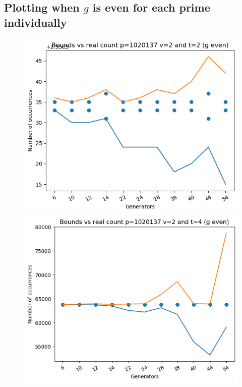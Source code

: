 \documentclass{article}
\begin{document}
\subsection{Plotting when $g$ is even for each prime individually}
\begin{figure}[H]
    \begin{minipage}{.49\textwidth}
            \centering
            \includegraphics[width=\textwidth]{../plots/tuples_figures/1020137v2geven/test_p1020137_v2_t2_g_even.png}
            \includegraphics[width=\textwidth]{../plots/tuples_figures/1020137v2geven/test_p1020137_v2_t4_g_even.png}

\end{minipage}
\end{figure}
\end{document}
